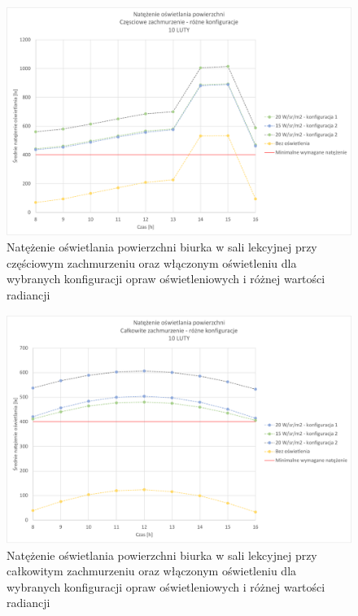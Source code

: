\documentclass[a4paper,12pt]{article}
\begin{document}
	\begin{figure}[!ht]
		\centering
		\includegraphics[scale=0.8]{Wykresy/oswietlenie_czesciowe_zachmurzenie_rozne_konfiguracje.pdf}
		\caption{Natężenie oświetlania powierzchni biurka w sali lekcyjnej przy częściowym zachmurzeniu  oraz włączonym oświetleniu dla wybranych konfiguracji opraw oświetleniowych i różnej wartości radiancji}
		\label{oswietlenie_czesciowe_zachmurzenie_rozne_konfiguracje}
	\end{figure}

	\begin{figure}[!ht]
		\centering
		\includegraphics[scale=0.8]{Wykresy/oswietlenie_calkowite_zachmurzenie_rozne_konfiguracje.pdf}
		\caption{Natężenie oświetlania powierzchni biurka w sali lekcyjnej przy całkowitym zachmurzeniu  oraz włączonym oświetleniu dla wybranych konfiguracji opraw oświetleniowych i różnej wartości radiancji}
		\label{oswietlenie_calkowite_zachmurzenie_rozne_konfiguracje}
	\end{figure}	
	\clearpage
\end{document}
